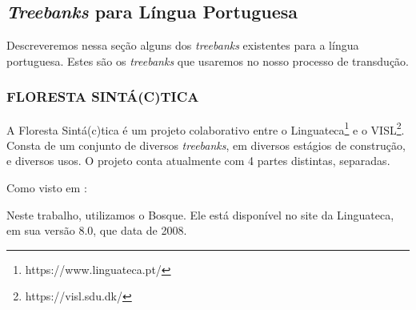 \subsection{\textit{Treebanks} para Língua Portuguesa}
\label{sec:tbPortugues}
Descreveremos nessa seção alguns dos \textit{treebanks} existentes para a língua portuguesa. Estes são os \textit{treebanks} que usaremos no nosso processo de transdução.

\subsubsection{FLORESTA SINTÁ(C)TICA}
\label{subsec:florestasintatica}

A Floresta Sintá(c)tica é um projeto colaborativo entre o Linguateca\footnote{https://www.linguateca.pt/} e o VISL\footnote{https://visl.sdu.dk/}. Consta de um conjunto de diversos \textit{treebanks}, em diversos estágios de construção, e diversos usos. O projeto conta atualmente com 4 partes distintas, separadas.

Como visto em :
\begin{quote}
\end{quote}

Neste trabalho, utilizamos o Bosque. Ele está disponível no site da Linguateca, em sua versão 8.0, que data de 2008. 

